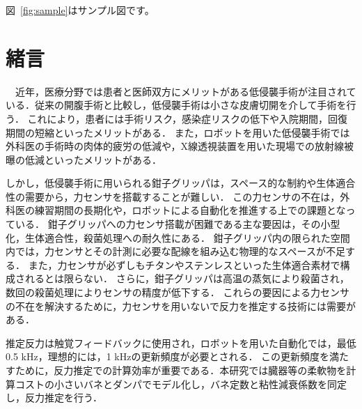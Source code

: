 \documentclass[a4paper]{jarticle}
\begin{document}
図~\ref{fig:sample}はサンプル図です。
\fi

\section{緒言}
　近年，医療分野では患者と医師双方にメリットがある低侵襲手術が注目されている\cite{MIS_ref1}．従来の開腹手術と比較し，低侵襲手術は小さな皮膚切開を介して手術を行う．
これにより，患者には手術リスク，感染症リスクの低下\cite{MIS_ref2}や入院期間\cite{MIS_ref3}，回復期間の短縮\cite{MIS_ref4}といったメリットがある．
また，ロボットを用いた低侵襲手術では外科医の手術時の肉体的疲労の低減や，X線透視装置を用いた現場での放射線被曝の低減といったメリットがある\cite{MIS_ref5}．

しかし，低侵襲手術に用いられる鉗子グリッパは，スペース的な制約\cite{MIS_ref1}や生体適合性の需要\cite{MIS_ref6}から，力センサを搭載することが難しい．
この力センサの不在は，外科医の練習期間の長期化\cite{MIS_learning_time}や，ロボットによる自動化を推進する上での課題となっている\cite{RMIS}．
鉗子グリッパへの力センサ搭載が困難である主な要因は，その小型化，生体適合性，殺菌処理への耐久性にある\cite{MIS_ref7}．
鉗子グリッパ内の限られた空間内では，力センサとその計測に必要な配線を組み込む物理的なスペースが不足する\cite{MIS_ref1}．
また，力センサが必ずしもチタンやステンレスといった生体適合素材で構成されるとは限らない\cite{MIS_ref6}．
さらに，鉗子グリッパは高温の蒸気により殺菌され，数回の殺菌処理によりセンサの精度が低下する\cite{MIS_ref7}．
これらの要因による力センサの不在を解決するために，力センサを用いないで反力を推定する技術には需要がある．

 推定反力は触覚フィードバックに使用され，ロボットを用いた自動化では，最低0.5 kHz\cite{fps_ref1}，理想的には，1 kHzの更新頻度が必要とされる\cite{fps_ref2}．
この更新頻度を満たすために，反力推定での計算効率が重要である．本研究では臓器等の柔軟物を計算コストの小さいバネとダンパでモデル化し，バネ定数と粘性減衰係数を同定し，反力推定を行う．

\end{document}
